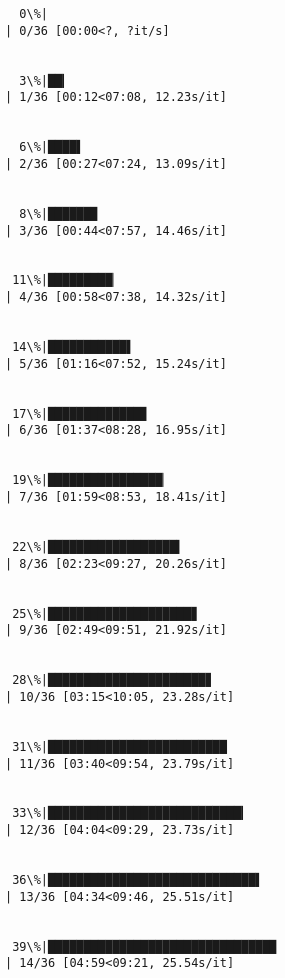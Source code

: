 \documentclass[11pt]{article}
\begin{document}
    \begin{Verbatim}[commandchars=\\\{\}]



  0\%|                                                                                           | 0/36 [00:00<?, ?it/s]


  3\%|██▎                                                                                | 1/36 [00:12<07:08, 12.23s/it]


  6\%|████▌                                                                              | 2/36 [00:27<07:24, 13.09s/it]


  8\%|██████▉                                                                            | 3/36 [00:44<07:57, 14.46s/it]


 11\%|█████████▏                                                                         | 4/36 [00:58<07:38, 14.32s/it]


 14\%|███████████▌                                                                       | 5/36 [01:16<07:52, 15.24s/it]


 17\%|█████████████▊                                                                     | 6/36 [01:37<08:28, 16.95s/it]


 19\%|████████████████▏                                                                  | 7/36 [01:59<08:53, 18.41s/it]


 22\%|██████████████████▍                                                                | 8/36 [02:23<09:27, 20.26s/it]


 25\%|████████████████████▊                                                              | 9/36 [02:49<09:51, 21.92s/it]


 28\%|██████████████████████▊                                                           | 10/36 [03:15<10:05, 23.28s/it]


 31\%|█████████████████████████                                                         | 11/36 [03:40<09:54, 23.79s/it]


 33\%|███████████████████████████▎                                                      | 12/36 [04:04<09:29, 23.73s/it]


 36\%|█████████████████████████████▌                                                    | 13/36 [04:34<09:46, 25.51s/it]


 39\%|███████████████████████████████▉                                                  | 14/36 [04:59<09:21, 25.54s/it]



\end{Verbatim}
\end{document}
